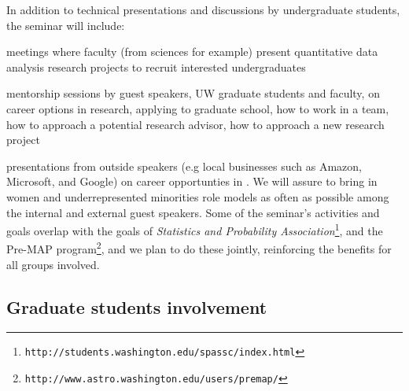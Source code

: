 In addition to technical presentations and discussions by undergraduate
students, the seminar will include:
\bits
\item meetings where faculty (from sciences for example) present quantitative data analysis research projects to recruit interested undergraduates
\item  mentorship sessions by guest speakers, UW graduate students and faculty, on career options in research, applying to graduate school, how to work in a team, how to approach a potential research advisor, how to approach a new research project
\item presentations from outside speakers (e.g local businesses such as Amazon,
  Microsoft, and Google) on career opportunties in \cdse. We will assure to bring in women and underrepresented minorities role models as often as possible among the internal and external guest speakers.
\eits
Some of the seminar's activities and goals overlap with the goals of {\em Statistics and Probability Association}\footnote{{\tt http://students.washington.edu/spassc/index.html}}, and the Pre-MAP program\footnote{\tt http://www.astro.washington.edu/users/premap/}, 
and we plan to do these jointly, reinforcing the  benefits for all groups involved.


\subsection{Graduate students involvement}
\label{sec:activities-grad}

